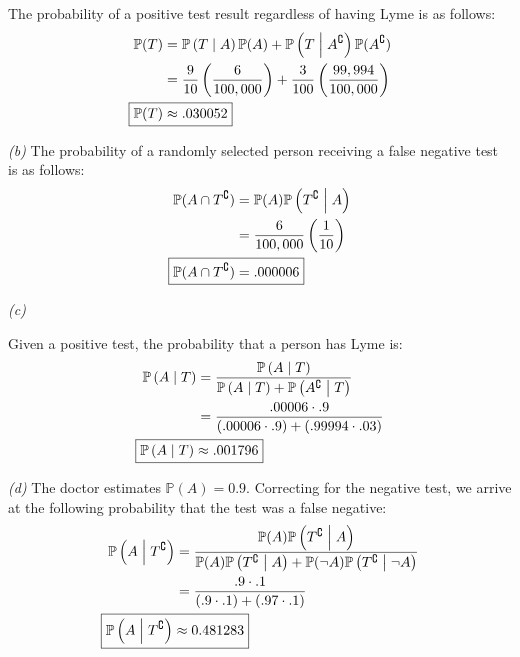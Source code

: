\documentclass[titlepage, 12pt, leqno]{article}
\begin{document}
The probability of a positive test result regardless of having Lyme is as follows:
\begin{align*}
    \mathbb{P}(T) &= \mathbb{P}\left(T \;\middle|\; A\right)\mathbb{P}(A) + \mathbb{P}\left(T \;\middle|\; A^\complement \right)\mathbb{P}(A^\complement) \\
                  &= \frac{9}{10} \left(\frac{6}{100,000} \right) + \frac{3}{100} \left(\frac{99,994}{100,000}\right) \\
    \Aboxed{\mathbb{P}(T) &\approx .030052} 
\end{align*}

\textit{(b)}
The probability of a randomly selected person receiving a false negative test is as follows:
\begin{align*}
    \mathbb{P}(A \cap T^\complement ) &= \mathbb{P}(A) \mathbb{P}\left(T^\complement  \;\middle|\; A\right) \\
                                      &= \frac{6}{100,000} \left(\frac{1}{10} \right) \\
    \Aboxed{\mathbb{P}(A \cap T^\complement) &= .000006} 
\end{align*}

\textit{(c)} 

Given a positive test, the probability that a person has Lyme is:
\begin{align*}
    \mathbb{P}\left(A \;\middle|\; T\right) &= \frac{ \mathbb{P}\left(A \;\middle|\; T\right) }{ \mathbb{P}\left(A \;\middle|\; T\right) + \mathbb{P}\left(A^\complement  \;\middle|\; T\right) } \\
                                            &= \frac{.00006 \cdot .9}{(.00006 \cdot .9)+(.99994 \cdot .03)} \\
    \Aboxed{\mathbb{P}\left(A \;\middle|\; T\right) &\approx .001796}
\end{align*}

\textit{(d)} 
The doctor estimates $\mathbb{P}(A) = 0.9$. Correcting for the negative test, we arrive at the following probability that the test was a false negative:
\begin{align*}
    \mathbb{P}\left(A \;\middle|\; T^\complement \right) &= \frac{\mathbb{P}(A) \mathbb{P}\left(T^\complement  \;\middle|\; A\right) }{\mathbb{P}(A) \mathbb{P}\left(T^\complement  \;\middle|\; A\right) + \mathbb{P}(\neg A) \mathbb{P}\left(T^\complement  \;\middle|\; \neg A\right) } \\
                                                         &= \frac{.9 \cdot .1}{(.9 \cdot .1)+(.97 \cdot .1)} \\
    \Aboxed{ \mathbb{P}\left(A \;\middle|\; T^\complement \right) &\approx 0.481283} 
\end{align*}
\end{document}
